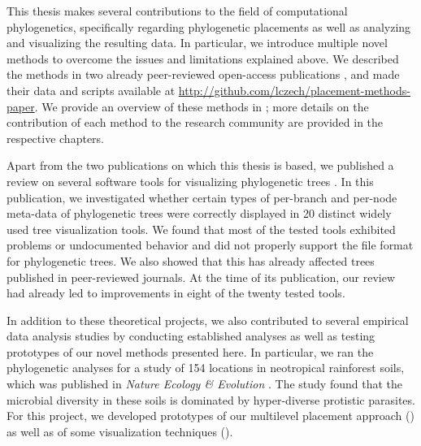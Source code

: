 This thesis makes several contributions to the field of computational phylogenetics,
specifically regarding phylogenetic placements as well as analyzing and visualizing the resulting data.
In particular, we introduce multiple novel methods to overcome the issues and limitations explained above.
We described the methods in two already peer-reviewed open-access publications \cite{Czech2018-phat,Czech2019-analysis},
and made their data and scripts available at \url{http://github.com/lczech/placement-methods-paper}.
We provide an overview of these methods in ;
more details on the contribution of each method to the research community are provided in the respective chapters.

Apart from the two publications on which this thesis is based,
we published a review on several software tools for visualizing phylogenetic trees \cite{Czech2017-tree-viewers}.
In this publication, we investigated whether certain types of per-branch and per-node meta-data of phylogenetic trees
were correctly displayed in \num{20} distinct widely used tree visualization tools.
We found that most of the tested tools exhibited problems or undocumented behavior and
did not properly support the  file format for phylogenetic trees.
We also showed that this has already affected trees published in peer-reviewed journals.
At the time of its publication, our review had already led to improvements in eight of the twenty tested tools.

In addition to these theoretical projects, we also contributed to several empirical data analysis studies
by conducting established analyses as well as testing prototypes of our novel methods presented here.
In particular, we ran the phylogenetic analyses for a study of \num{154} locations
in neotropical rainforest soils, which was published in \textit{Nature Ecology \& Evolution} \cite{Mahe2017}.
The study found that the microbial diversity in these soils is dominated by hyper-diverse protistic parasites.
For this project, we developed prototypes of our multilevel placement approach
()
as well as of some visualization techniques ().


